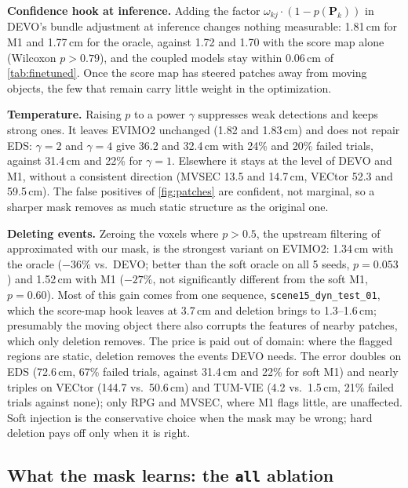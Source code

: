 \documentclass[conference]{IEEEtran}
\newcommand{\code}[1]{\texttt{#1}}
\begin{document}
\textbf{Confidence hook at inference.} Adding the factor
$\omega_{kj} \cdot (1 - p(\mathbf{P}_k))$ in DEVO's bundle adjustment at inference changes
nothing measurable: 1.81\,cm for M1 and 1.77\,cm for the oracle, against 1.72 and 1.70
with the score map alone (Wilcoxon $p > 0.79$), and the coupled models stay within
0.06\,cm of \cref{tab:finetuned}. Once the score map has steered patches away from moving
objects, the few that remain carry little weight in the optimization.

\textbf{Temperature.} Raising $p$ to a power $\gamma$ suppresses weak detections and keeps
strong ones. It leaves EVIMO2 unchanged (1.82 and 1.83\,cm) and does not repair EDS:
$\gamma = 2$ and $\gamma = 4$ give 36.2 and 32.4\,cm with 24\% and 20\% failed trials,
against 31.4\,cm and 22\% for $\gamma = 1$. Elsewhere it stays at the level of DEVO and
M1, without a consistent direction (MVSEC 13.5 and 14.7\,cm, VECtor 52.3 and 59.5\,cm).
The false positives of \cref{fig:patches} are confident, not marginal, so a sharper mask
removes as much static structure as the original one.

\textbf{Deleting events.} Zeroing the voxels where $p > 0.5$, the upstream filtering
of~\cite{pellerito2026suppression} approximated with our mask, is the strongest variant on
EVIMO2: 1.34\,cm with the oracle ($-36\%$ vs.\ DEVO; better than the soft oracle on all 5
seeds, $p = 0.053$) and 1.52\,cm with M1 ($-27\%$, not significantly different from the
soft M1, $p = 0.60$). Most of this gain comes from one sequence,
\code{scene15\_dyn\_test\_01}, which the score-map hook leaves at 3.7\,cm and deletion
brings to 1.3--1.6\,cm; presumably the moving object there also corrupts the features of
nearby patches, which only deletion removes. The price is paid out of domain: where the
flagged regions are static, deletion removes the events DEVO needs. The error doubles on
EDS (72.6\,cm, 67\% failed trials, against 31.4\,cm and 22\% for soft M1) and nearly
triples on VECtor (144.7 vs.\ 50.6\,cm) and TUM-VIE (4.2 vs.\ 1.5\,cm, 21\% failed trials
against none); only RPG and MVSEC, where M1 flags little, are unaffected. Soft injection is
the conservative choice when the mask may be wrong; hard deletion pays off only when it is
right.

\subsection{What the mask learns: the \code{all} ablation}\label{sec:all}
\end{document}
